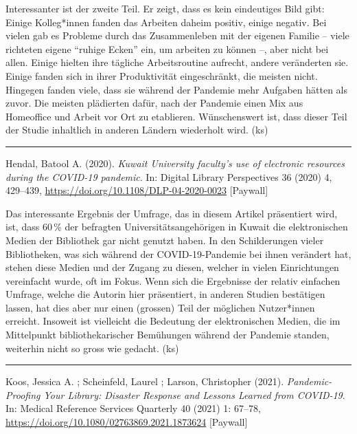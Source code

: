 \documentclass[a4paper,
fontsize=11pt,
oneside,
numbers=noperiodatend,
parskip=half-,
bibliography=totoc,
final
]{scrartcl}
\begin{document}
Interessanter ist der zweite Teil. Er zeigt, dass es kein eindeutiges
Bild gibt: Einige Kolleg*innen fanden das Arbeiten daheim positiv,
einige negativ. Bei vielen gab es Probleme durch das Zusammenleben mit
der eigenen Familie -- viele richteten eigene \enquote{ruhige Ecken}
ein, um arbeiten zu können --, aber nicht bei allen. Einige hielten ihre
tägliche Arbeitsroutine aufrecht, andere veränderten sie. Einige fanden
sich in ihrer Produktivität eingeschränkt, die meisten nicht. Hingegen
fanden viele, dass sie während der Pandemie mehr Aufgaben hätten als
zuvor. Die meisten plädierten dafür, nach der Pandemie einen Mix aus
Homeoffice und Arbeit vor Ort zu etablieren. Wünschenswert ist, dass
dieser Teil der Studie inhaltlich in anderen Ländern wiederholt wird.
(ks)

\begin{center}\rule{0.5\linewidth}{0.5pt}\end{center}

Hendal, Batool A. (2020). \emph{Kuwait University faculty's use of
electronic resources during the COVID-19 pandemic}. In: Digital Library
Perspectives 36 (2020) 4, 429--439,
\url{https://doi.org/10.1108/DLP-04-2020-0023} {[}Paywall{]}

Das interessante Ergebnis der Umfrage, das in diesem Artikel präsentiert
wird, ist, dass 60\,\% der befragten Universitätsangehörigen in Kuwait die
elektronischen Medien der Bibliothek gar nicht genutzt haben. In den
Schilderungen vieler Bibliotheken, was sich während der
COVID-19-Pandemie bei ihnen verändert hat, stehen diese Medien und der
Zugang zu diesen, welcher in vielen Einrichtungen vereinfacht wurde, oft
im Fokus. Wenn sich die Ergebnisse der relativ einfachen Umfrage, welche
die Autorin hier präsentiert, in anderen Studien bestätigen lassen, hat
dies aber nur einen (grossen) Teil der möglichen Nutzer*innen erreicht.
Insoweit ist vielleicht die Bedeutung der elektronischen Medien, die im
Mittelpunkt bibliothekarischer Bemühungen während der Pandemie standen,
weiterhin nicht so gross wie gedacht. (ks)

\begin{center}\rule{0.5\linewidth}{0.5pt}\end{center}

Koos, Jessica A. ; Scheinfeld, Laurel ; Larson, Christopher (2021).
\emph{Pandemic-Proofing Your Library: Disaster Response and Lessons
Learned from COVID-19}. In: Medical Reference Services Quarterly 40
(2021) 1: 67--78, \url{https://doi.org/10.1080/02763869.2021.1873624}
{[}Paywall{]}
\end{document}
